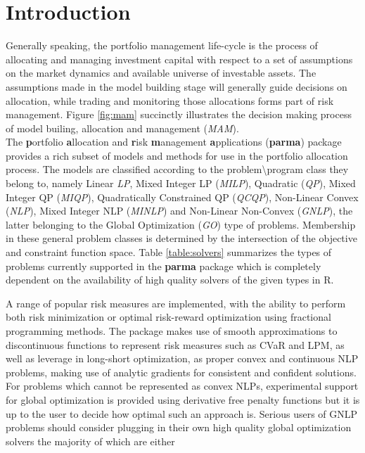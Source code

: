 \section{Introduction}
Generally speaking, the portfolio management life-cycle is the process of
allocating and managing investment capital with respect to a set of
assumptions on the market dynamics and available universe of investable
assets. The assumptions made in the model building stage will generally
guide decisions on allocation, while trading and monitoring those
allocations forms part of risk management. Figure \ref{fig:mam}
succinctly illustrates the decision making process of model builing,
allocation and management (\emph{MAM}).\\

The \textbf{p}ortfolio \textbf{a}llocation and \textbf{r}isk
\textbf{m}anagement \textbf{a}pplications (\textbf{parma})
package provides a rich subset of models and methods for use in the
portfolio allocation process. The models are classified according to
the problem\textbackslash program class they belong to, namely
Linear \emph{LP}, Mixed Integer LP (\emph{MILP}), Quadratic (\emph{QP}),
Mixed Integer QP (\emph{MIQP}), Quadratically Constrained QP (\emph{QCQP}),
Non-Linear Convex (\emph{NLP}), Mixed Integer NLP (\emph{MINLP}) and
Non-Linear Non-Convex (\emph{GNLP}), the latter belonging to the
Global Optimization (\emph{GO}) type of problems.
Membership in these general problem classes is determined by the intersection
of the objective and constraint function space. Table \ref{table:solvers}
summarizes the types of problems currently supported in the \textbf{parma} package
which is completely dependent on the availability of high quality solvers of the
given types in R.

A range of popular risk measures are implemented, with the ability to perform
both risk minimization or optimal risk-reward optimization using fractional
programming methods. The package makes use of smooth approximations to
discontinuous functions to represent risk measures such as CVaR and LPM, as
well as leverage in long-short optimization, as proper convex and continuous
NLP problems, making use of analytic gradients for consistent and confident
solutions. For problems which cannot be represented as convex NLPs,
experimental support for global optimization is provided using derivative
free penalty functions but it is up to the user to decide how optimal such an
approach is. Serious users of GNLP problems should consider plugging in their
own high quality global optimization solvers the majority of which are either
